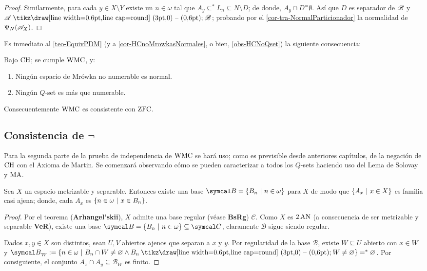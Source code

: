 \begin{proof}
        Similarmente, para cada $y \in X \setminus Y$ existe un $n \in \omega$ tal que $A_y \subseteq^* L_n \subseteq N \setminus D$; de donde, $A_y \cap D ^= \emptyset$. Así que $D$ es separador de $\mathscr{B}$ y $\ms{A} \setminus \ms{B}$; probando por el \autoref{cor-tra-NormalParticionador} la normalidad de $\Psi_N(\mathscr{A}_X)$.
    \end{proof}

    Es inmediato al \autoref{teo-EquivPDM} (y a \ref{cor-HCnoMrowkasNormales}, o bien, \ref{obs-HCNoQset}) la siguiente consecuencia:

    \begin{corolario}\label{cor-PdmConsistente}
        Bajo $\operatorname{CH}$; se cumple $\operatorname{WMC}$, y:
        \begin{enumerate}
            \item Ningún espacio de Mrówka no numerable es normal.
            \item Ningún $Q$-set es más que numerable.
        \end{enumerate}
        Consecuentemente $\operatorname{WMC}$ es consistente con $\operatorname{ZFC}$.
    \end{corolario}

    \subsection{Consistencia de \texorpdfstring{$\lnot$}\textsf{WMC}}

    Para la segunda parte de la prueba de independencia de $\operatorname{WMC}$ se hará uso; como es previsible desde anteriores capítulos, de la negación de $\operatorname{CH}$ con el Axioma de Martin. Se comenzará observando cómo se pueden caracterizar a todos los $Q$-sets haciendo uso del Lema de Solovay y $\operatorname{MA}$.

    \begin{lema}
        Sea $X$ un espacio metrizable y separable. Entonces existe una base $\mathcal{B}=\{B_n \tq n \in \omega\}$ para $X$ de modo que $\{A_x \text{ $|$ } x \in X\}$ es familia casi ajena; donde, cada $A_x$ es $\{n \in \omega \text{ $|$ } x \in B_n\}$.
    \end{lema}
    \begin{proof}
        Por el teorema (\textbf{Arhangel’skii}), $X$ admite una base regular (véase \textbf{BsRg}) $\mathcal{C}$. Como $X$ es $2\operatorname{AN}$ (a consecuencia de ser metrizable y separable \textbf{VeR}), existe una base $\mathcal{B}=\{B_n \tq n \in \omega\} \subseteq \mathcal{C}$, claramente $\mathcal{B}$ sigue siendo regular.

        Dados $x,y \in X$ son distintos, sean $U,V$ abiertos ajenos que separan a $x$ y $y$. Por regularidad de la base $\mathcal{B}$, existe $W \subseteq U$ abierto con $x\in W$ y
        $\mathcal{B}_W:=\{n \in \omega \tq B_n \cap W \neq \emptyset \land B_n \setminus W \neq \emptyset\} =^* \emptyset$. Por consiguiente, el conjunto $A_x \cap A_y \subseteq \mathcal{B}_W$ es finito.
    \end{proof}

